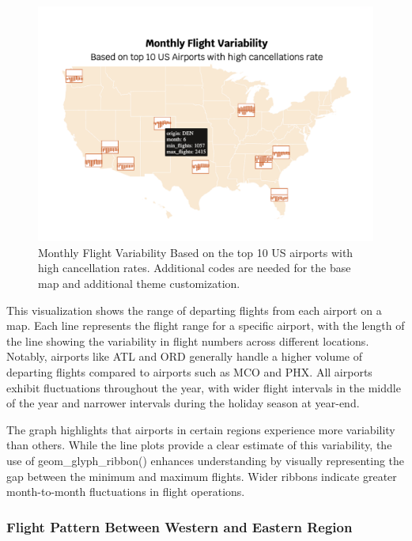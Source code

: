 \begin{figure}
\includegraphics[width=15.14in]{figures/monthly-flight-variability} \caption{Monthly Flight Variability Based on the top 10 US airports with high cancellation rates. Additional codes are needed for the base map and additional theme customization.}\label{fig:unnamed-chunk-25}
\end{figure}

This visualization shows the range of departing flights from each airport on a map. Each line represents the flight range for a specific airport, with the length of the line showing the variability in flight numbers across different locations. Notably, airports like ATL and ORD generally handle a higher volume of departing flights compared to airports such as MCO and PHX. All airports exhibit fluctuations throughout the year, with wider flight intervals in the middle of the year and narrower intervals during the holiday season at year-end.

The graph highlights that airports in certain regions experience more variability than others. While the line plots provide a clear estimate of this variability, the use of geom\_glyph\_ribbon() enhances understanding by visually representing the gap between the minimum and maximum flights. Wider ribbons indicate greater month-to-month fluctuations in flight operations.

\subsubsection{Flight Pattern Between Western and Eastern Region}\label{flight-pattern-between-western-and-eastern-region}

